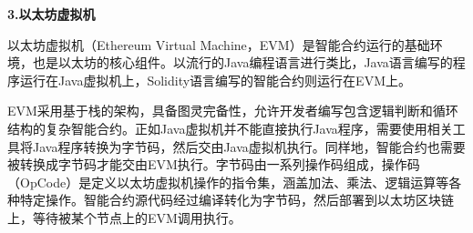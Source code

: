 


\par\textbf{3.以太坊虚拟机}
    
以太坊虚拟机（Ethereum Virtual Machine，EVM）是智能合约运行的基础环境，也是以太坊的核心组件。以流行的Java编程语言进行类比，Java语言编写的程序运行在Java虚拟机上，Solidity语言编写的智能合约则运行在EVM上。

EVM采用基于栈的架构，具备图灵完备性，允许开发者编写包含逻辑判断和循环结构的复杂智能合约。正如Java虚拟机并不能直接执行Java程序，需要使用相关工具将Java程序转换为字节码，然后交由Java虚拟机执行。同样地，智能合约也需要被转换成字节码才能交由EVM执行。字节码由一系列操作码组成，操作码（OpCode）是定义以太坊虚拟机操作的指令集，涵盖加法、乘法、逻辑运算等各种特定操作。智能合约源代码经过编译转化为字节码，然后部署到以太坊区块链上，等待被某个节点上的EVM调用执行。


